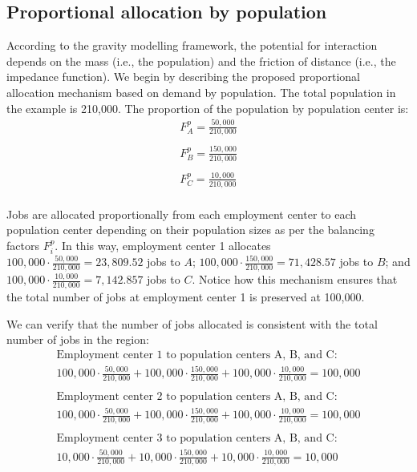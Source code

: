 \documentclass[]{elsarticle} %
\begin{document}
\hypertarget{proportional-allocation-by-population}{%
\subsection{Proportional allocation by
population}\label{proportional-allocation-by-population}}

According to the gravity modelling framework, the potential for
interaction depends on the mass (i.e., the population) and the friction
of distance (i.e., the impedance function). We begin by describing the
proposed proportional allocation mechanism based on demand by
population. The total population in the example is 210,000. The
proportion of the population by population center is: \[
\begin{array}{l}
F^p_A = \frac{50,000}{210,000}\\
\\
F^p_B = \frac{150,000}{210,000}\\
\\
F^p_C = \frac{10,000}{210,000}\\
\end{array}
\]

Jobs are allocated proportionally from each employment center to each
population center depending on their population sizes as per the
balancing factors \(F^p_i\). In this way, employment center 1 allocates
\(100,000\cdot \frac{50,000}{210,000}= 23,809.52\) jobs to \(A\);
\(100,000\cdot \frac{150,000}{210,000}= 71,428.57\) jobs to \(B\); and
\(100,000\cdot \frac{10,000}{210,000}= 7,142.857\) jobs to \(C\). Notice
how this mechanism ensures that the total number of jobs at employment
center 1 is preserved at 100,000.

We can verify that the number of jobs allocated is consistent with the
total number of jobs in the region: \[
\begin{array}{l}
\text{Employment center 1 to population centers A, B, and C: }\\
100,000 \cdot \frac{50,000}{210,000} + 100,000 \cdot \frac{150,000}{210,000} + 100,000 \cdot \frac{10,000}{210,000} = 100,000\\
\\
\text{Employment center 2 to population centers A, B, and C: }\\
100,000 \cdot \frac{50,000}{210,000} + 100,000 \cdot \frac{150,000}{210,000} + 100,000 \cdot \frac{10,000}{210,000} = 100,000\\
\\
\text{Employment center 3 to population centers A, B, and C: }\\
10,000 \cdot \frac{50,000}{210,000} + 10,000 \cdot \frac{150,000}{210,000} + 10,000 \cdot \frac{10,000}{210,000} = 10,000\\
\end{array}
\]
\end{document}
